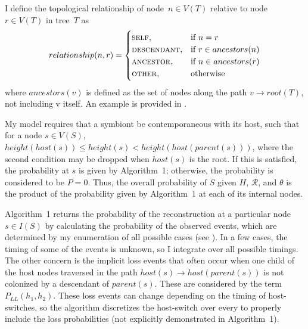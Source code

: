\documentclass[12pt,letterpaper]{article}
\newcommand{\R}{\ensuremath{\mathcal{R}}}
\begin{document}
I define the topological relationship of node~$n \in V(T)$ relative to node~$r \in V(T)$ in tree~$T$ as
\begin{equation}
relationship(n, r) = 
\begin{cases}
\text{\textsc{self}}, & \text{if}\ n = r \\
\text{\textsc{descendant}}, & \text{if}\ r \in ancestors(n) \\
\text{\textsc{ancestor}}, & \text{if}\ n \in ancestors(r) \\
\text{\textsc{other}}, & \text{otherwise} \\
\end{cases}
\end{equation}
where $ancestors(v)$ is defined as the set of nodes along the path $v \rightarrow root(T)$, not including v itself. An example is provided in .

My model requires that a symbiont be contemporaneous with its host, such that for a node $s \in V(S)$, $height(host(s)) \leq height(s) < height(host(parent(s)))$, where the second condition may be dropped when $host(s)$ is the root. If this is satisfied, the probability at $s$ is given by Algorithm~1; otherwise, the probability is considered to be $P=0$. Thus, the overall probability of $S$ given $H$, $\R$, and $\theta$ is the product of the probability given by Algorithm~1 at each of its internal nodes.

Algorithm~1 returns the probability of the reconstruction at a particular node $s \in I(S)$ by calculating the probability of the observed events, which are determined by my enumeration of all possible cases (see ). In a few cases, the timing of some of the events is unknown, so I integrate over all possible timings. The other concern is the implicit loss events that often occur when one child of the host nodes traversed in the path $host(s) \rightarrow host(parent(s))$ is not colonized by a descendant of $parent(s)$. These are considered by the term $P_{LL}(h_1, h_2)$. These loss events can change depending on the timing of host-switches, so the algorithm discretizes the host-switch over every to properly include the loss probabilities (not explicitly demonstrated in Algorithm~1).

\newcommand{\defcase}[2]{$r_\text{left} = \text{\textsc{#1}}$ and $r_\text{right} = \text{\textsc{#2}}$}
\end{document}
